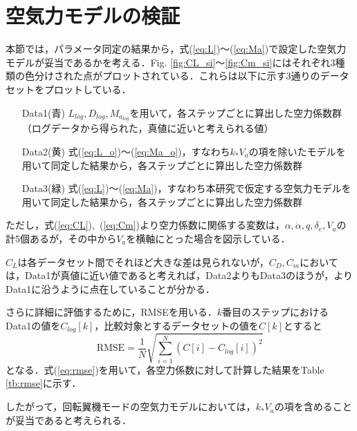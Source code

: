 \section{空気力モデルの検証}
\label{sec:airf_model_ver}

本節では，パラメータ同定の結果から，式(\ref{eq:L})〜(\ref{eq:Ma})で設定した空気力モデルが妥当であるかを考える．Fig. \ref{fig:CL_si}〜\ref{fig:Cm_si}にはそれぞれ3種類の色分けされた点がプロットされている．これらは以下に示す3通りのデータセットをプロットしている．

\begin{itemize}
  \setlength{\leftskip}{1.0cm}
  \setlength{\rightskip}{1.5cm}
  \item[Data1(青)] $L_{log},D_{log},M_{a_{log}}$を用いて，各ステップごとに算出した空力係数群\\（ログデータから得られた，真値に近いと考えられる値）
  \item[Data2(黄)] 式(\ref{eq:L_o})〜(\ref{eq:Ma_o})，すなわち$k_* V_a$の項を除いたモデルを用いて同定した結果から，各ステップごとに算出した空力係数群
  \item[Data3(緑)] 式(\ref{eq:L})〜(\ref{eq:Ma})，すなわち本研究で仮定する空気力モデルを用いて同定した結果から，各ステップごとに算出した空力係数群
\end{itemize}

ただし，式(\ref{eq:CL}),~(\ref{eq:Cm})より空力係数に関係する変数は，$\alpha,\dot{\alpha},q,\delta_e,V_a$の計5個あるが，その中から$V_a$を横軸にとった場合を図示している．

$C_L$は各データセット間でそれほど大きな差は見られないが，$C_D,C_m$においては，Data1が真値に近い値であると考えれば，Data2よりもData3のほうが，よりData1に沿うように点在していることが分かる．

さらに詳細に評価するために，RMSEを用いる．$k$番目のステップにおけるData1の値を$C_{log}[k]$，比較対象とするデータセットの値を$C[k]$とすると
\begin{equation}
  \mbox{RMSE} = \dfrac{1}{N}\sqrt{\sum_{i=1}^{N}(C[i]-C_{log}[i])^{2}}
  \label{eq:rmse}
\end{equation}
となる\cite{}．式(\ref{eq:rmse})を用いて，各空力係数に対して計算した結果をTable \ref{tb:rmse}に示す．

したがって，回転翼機モードの空気力モデルにおいては，$k_* V_a$の項を含めることが妥当であると考えられる．

